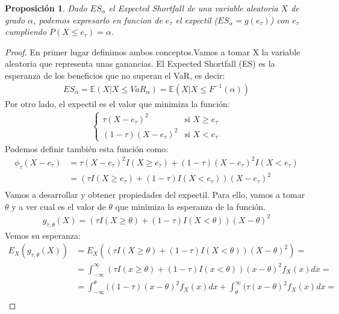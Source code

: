 \documentclass[11pt]{book}
\theoremstyle{plain} %
\newtheorem{proposition}{Proposición}
\theoremstyle{definition} %
\begin{document}
\begin{proposition}
   Dado $ES_\alpha$ el Expected Shortfall de una variable aleatoria $X$ de grado $\alpha$, 
   podemos expresarlo en funcion de $e_\tau$ el expectil ($ES_\alpha = g(e_\tau)$) con 
   $e_\tau$ cumpliendo $P(X \leq e_\tau) = \alpha$. 
\end{proposition}
\begin{proof}
   En primer lugar definimos ambos conceptos.Vamos a tomar X la variable
   aleatoria que representa unas ganancias. El Expected Shortfall (ES)
   es la esperanza de los beneficios que no superan el VaR, es decir:
   \begin{align*}
       ES_\alpha = \mathbb{E}(X|X\leq VaR_\alpha) = \mathbb{E}(X|X\leq F^{-1}(\alpha))
   \end{align*}
   Por otro lado, el expectil es el valor que minimiza la función:
   \begin{align*}
       \begin{cases}
           \tau(X - e_\tau)^2 & \text{si } X \ge e_\tau \\
           (1 - \tau)(X - e_\tau)^2 & \text{si } X < e_\tau
       \end{cases}
   \end{align*}
   Podemos definir también esta función como:
   \begin{align*}
       \phi_{\tau}(X - e_\tau) &= \tau(X - e_\tau)^2 I(X \ge e_\tau) + (1 - \tau)(X - e_\tau)^2 I(X < e_\tau) \\
        &= (\tau I(X \ge e_\tau) + (1 - \tau)I(X < e_\tau))(X - e_\tau)^2 \\
   \end{align*}
   Vamos a desarrollar y obtener propiedades del expectil. Para ello, 
   vamos a tomar $\theta$ y a ver cual es  el valor de $\theta$ que minimiza 
   la esperanza de la función.
   \begin{align*}
      g_{\tau, \theta}(X) = (\tau I(X \ge \theta) + (1 - \tau)I(X < \theta))(X - \theta)^2 
   \end{align*}
   Vemos su esperanza:
   \begin{align*}
      E_{X}(g_{\tau, \theta}(X)) &= E_{X}((\tau I(X \ge \theta) + (1 - \tau)I(X < \theta))(X - \theta)^2) = \\
      &= \int_{-\infty}^{\infty}(\tau I(x \ge \theta) + (1 - \tau)I(x < \theta))(x - \theta)^2 f_X(x)dx = \\
      &= \int_{-\infty}^{\theta}((1 - \tau)(x - \theta)^2 f_X(x)dx + \int_{\theta}^{\infty}(\tau (x - \theta)^2 f_X(x)dx = \\

\end{align*}
\end{proof}
\end{document}
